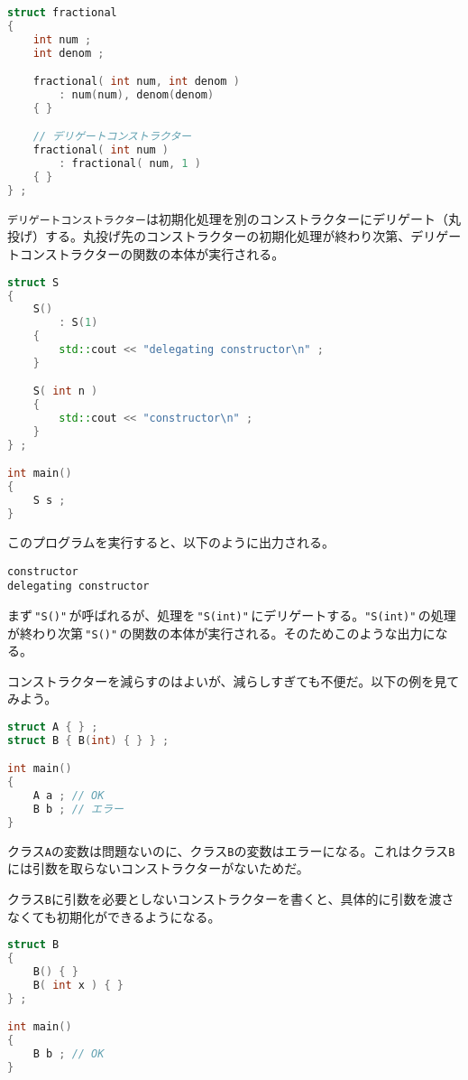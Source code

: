 \begin{lstlisting}[language={C++}]
struct fractional
{
    int num ;
    int denom ;

    fractional( int num, int denom )
        : num(num), denom(denom)
    { }

    // デリゲートコンストラクター
    fractional( int num )
        : fractional( num, 1 )
    { }
} ;
\end{lstlisting}

\texttt{デリゲートコンストラクター}は初期化処理を別のコンストラクターにデリゲート（丸投げ）する。丸投げ先のコンストラクターの初期化処理が終わり次第、デリゲートコンストラクターの関数の本体が実行される。

\begin{lstlisting}[language={C++}]
struct S
{
    S()
        : S(1)
    {
        std::cout << "delegating constructor\n" ;
    }

    S( int n )
    {
        std::cout << "constructor\n" ;
    }
} ;

int main()
{
    S s ;
}
\end{lstlisting}

このプログラムを実行すると、以下のように出力される。

\begin{lstlisting}[style=terminal]
constructor
delegating constructor
\end{lstlisting}

まず\,\texttt{"S()"}\,が呼ばれるが、処理を\,\texttt{"S(int)"}\,にデリゲートする。\texttt{"S(int)"}\,の処理が終わり次第\,\texttt{"S()"}\,の関数の本体が実行される。そのためこのような出力になる。

コンストラクターを減らすのはよいが、減らしすぎても不便だ。以下の例を見てみよう。

\begin{lstlisting}[language={C++}]
struct A { } ;
struct B { B(int) { } } ;

int main()
{
    A a ; // OK
    B b ; // エラー
}
\end{lstlisting}

クラス\texttt{A}の変数は問題ないのに、クラス\texttt{B}の変数はエラーになる。これはクラス\texttt{B}には引数を取らないコンストラクターがないためだ。

クラス\texttt{B}に引数を必要としないコンストラクターを書くと、具体的に引数を渡さなくても初期化ができるようになる。

\ifTombow\enlargethispage{3mm}\fi
\begin{lstlisting}[language={C++}]
struct B
{
    B() { }
    B( int x ) { }
} ;

int main()
{
    B b ; // OK
}
\end{lstlisting}

